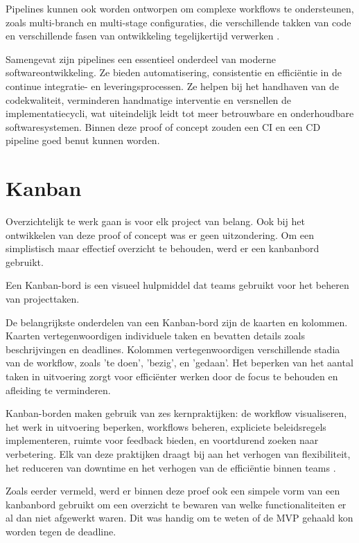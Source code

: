 Pipelines kunnen ook worden ontworpen om complexe workflows te ondersteunen, zoals multi-branch en multi-stage configuraties, die verschillende takken van code en verschillende fasen van ontwikkeling tegelijkertijd verwerken \autocite{Merode2023}.

Samengevat zijn pipelines een essentieel onderdeel van moderne softwareontwikkeling. Ze bieden automatisering, consistentie en efficiëntie in de continue integratie- en leveringsprocessen. Ze helpen bij het handhaven van de codekwaliteit, verminderen handmatige interventie en versnellen de implementatiecycli, wat uiteindelijk leidt tot meer betrouwbare en onderhoudbare softwaresystemen. 
Binnen deze proof of concept zouden een CI en een CD pipeline goed benut kunnen worden.

\section{Kanban}
Overzichtelijk te werk gaan is voor elk project van belang. Ook bij het ontwikkelen van deze proof of concept was er geen uitzondering. Om een simplistisch maar effectief overzicht te behouden, werd er een kanbanbord gebruikt.

Een Kanban-bord is een visueel hulpmiddel dat teams gebruikt voor het beheren van projecttaken.

De belangrijkste onderdelen van een Kanban-bord zijn de kaarten en kolommen. Kaarten vertegenwoordigen individuele taken en bevatten details zoals beschrijvingen en deadlines. Kolommen vertegenwoordigen verschillende stadia van de workflow, zoals 'te doen', 'bezig', en 'gedaan'. Het beperken van het aantal taken in uitvoering zorgt voor efficiënter werken door de focus te behouden en afleiding te verminderen.

Kanban-borden maken gebruik van zes kernpraktijken: de workflow visualiseren, het werk in uitvoering beperken, workflows beheren, expliciete beleidsregels implementeren, ruimte voor feedback bieden, en voortdurend zoeken naar verbetering. Elk van deze praktijken draagt bij aan het verhogen van flexibiliteit, het reduceren van downtime en het verhogen van de efficiëntie binnen teams \autocite{Hennigan2024}.

Zoals eerder vermeld, werd er binnen deze proef ook een simpele vorm van een kanbanbord gebruikt om een overzicht te bewaren van welke functionaliteiten er al dan niet afgewerkt waren. Dit was handig om te weten of de \gls{MVP} gehaald kon worden tegen de deadline.
